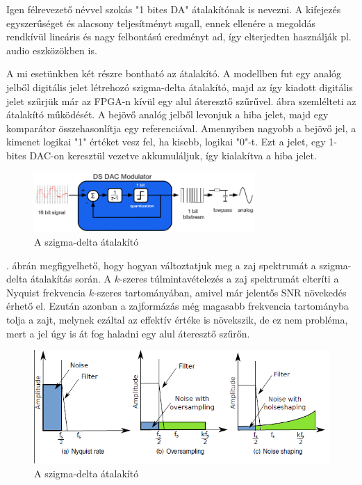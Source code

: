
Igen félrevezető névvel szokás "1 bites DA" átalakítónak is nevezni. A kifejezés egyszerűséget és alacsony teljesítményt sugall, ennek ellenére a megoldás rendkívül lineáris és nagy felbontású eredményt ad, így elterjedten használják pl. audio eszközökben is.

A mi esetünkben két részre bontható az átalakító. A modellben fut egy analóg jelből digitális jelet létrehozó szigma-delta átalakító, majd az így kiadott digitális jelet szűrjük már az FPGA-n kívül egy alul áteresztő szűrűvel.  ábra szemlélteti az átalakító működését. A bejövő analóg jelből levonjuk a hiba jelet, majd egy komparátor összehasonlítja egy referenciával. Amennyiben nagyobb a bejövő jel, a kimenet logikai "1" értéket vesz fel, ha kisebb, logikai "0"-t. Ezt a jelet, egy 1-bites DAC-on keresztül vezetve akkumuláljuk, így kialakítva a hiba jelet. 

\begin{figure}[!h]
	\centering
	\includegraphics[width = 0.75\textwidth]{figures/first_oder_sd.png}
	\caption{A szigma-delta átalakító} 
	\label{fig:sigmadelta}
\end{figure}


. ábrán megfigyelhető, hogy hogyan változtatjuk meg a zaj spektrumát a szigma-delta átalakítás során. A $k$-szeres túlmintavételezés a zaj spektrumát elteríti a Nyquist frekvencia $k$-szeres tartományában, amivel már jelentős SNR növekedés érhető el. Ezután azonban a zajformázás még magasabb frekvencia tartományba tolja a zajt, melynek ezáltal az effektív értéke is növekszik, de ez nem probléma, mert a jel úgy is át fog haladni egy alul áteresztő szűrőn.

\begin{figure}[!h]
	\centering
	\includegraphics[width = \textwidth]{figures/noiseshape.png}
	\caption{A szigma-delta átalakító} 
	\label{fig:asd}
\end{figure}

